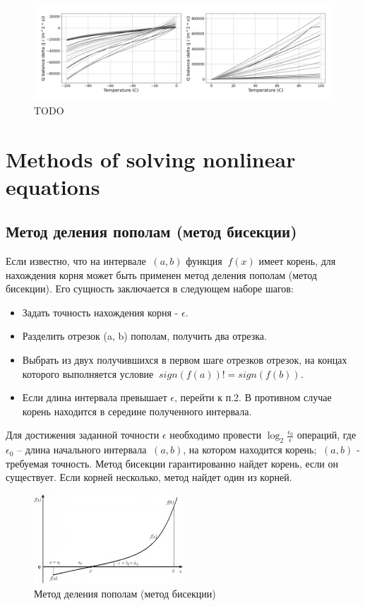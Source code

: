\documentclass[
11pt,%
tightenlines,%
twoside,%
onecolumn,%
nofloats,%
nobibnotes,%
nofootinbib,%
superscriptaddress,%
noshowpacs,%
centertags]%
{revtex4}
\begin{document}
\begin{figure}[h]
\setcaptionmargin{5mm}
\onelinecaptionstrue
\includegraphics[width=1.0\textwidth]{pics/dq_rime_wet.pdf}
\caption{TODO}\label{fig:dq_rime_wet}
\end{figure}

\section{Methods of solving nonlinear equations}

\subsection{Метод деления пополам (метод бисекции)}
Если известно, что на интервале $\ (a, b)$ функция $\ f(x)$ имеет корень, для нахождения корня может быть применен метод деления пополам (метод бисекции). Его сущность заключается в следующем наборе шагов:
\begin{itemize}
\item Задать точность нахождения корня - $\epsilon$.
\item Разделить отрезок (a, b) пополам, получить два отрезка.
\item Выбрать из двух получившихся в первом шаге отрезков отрезок, на концах которого выполняется условие $\ sign(f(a)) != sign(f(b))$.
\item Если длина интервала превышает $\epsilon$, перейти к п.2. В противном случае корень находится в середине полученного интервала.
\end{itemize}
	
Для достижения заданной точности $\epsilon$ необходимо провести $\log_2\frac{\epsilon_0}{\epsilon}$  операций, где $\epsilon_0$ – длина начального интервала $\ (a, b)$, на котором находится корень; $\ (a, b)$ - требуемая точность. Метод бисекции гарантированно найдет корень, если он существует. Если корней несколько, метод найдет один из корней.

\begin{figure}[h]
\setcaptionmargin{5mm}
\onelinecaptionstrue
\includegraphics[width=0.5\textwidth]{pics/half_divide.pdf}
\caption{Метод деления пополам (метод бисекции)}\label{fig:dq_rime_wet}
\end{figure}
\end{document}
